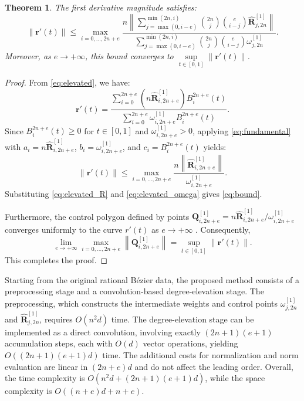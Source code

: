 \documentclass[preprint,12pt]{elsarticle}
\newcommand{\norm}[1]{\left\lVert #1 \right\rVert}
\newtheorem{Theorem}{Theorem}
\begin{document}
\begin{Theorem}\label{thm:bound}
The first derivative magnitude satisfies:
\begin{equation}\label{eq:bound}
\norm{\mathbf{r}'(t)} \leq \max_{i=0,\ldots,2n+e} \frac{n \norm{ \sum_{j=\max(0,i-e)}^{\min(2n,i)} \binom{2n}{j}\binom{e}{i-j} \widehat{\mathbf{R}}^{[1]}_{j,2n} }}{\sum_{j=\max(0,i-e)}^{\min(2n,i)} \binom{2n}{j}\binom{e}{i-j} \omega^{[1]}_{j,2n}}.
\end{equation}
Moreover, as $e \to +\infty$, this bound converges to $\sup\limits_{t \in [0,1]} \norm{\mathbf{r}'(t)}$.
\end{Theorem}

\begin{proof}
From \eqref{eq:elevated}, we have:
\[
\mathbf{r}'(t) = \frac{\sum_{i=0}^{2n+e} \left(n\widehat{\mathbf{R}}^{[1]}_{i,2n+e}\right) B^{2n+e}_i(t)}{\sum_{i=0}^{2n+e} \omega^{[1]}_{i,2n+e} B^{2n+e}_i(t)}.
\]
Since $B^{2n+e}_i(t) \geq 0$ for $t \in [0,1]$ and $\omega^{[1]}_{i,2n+e} > 0$, applying \eqref{eq:fundamental} with $a_i = n\widehat{\mathbf{R}}^{[1]}_{i,2n+e}$, $b_i = \omega^{[1]}_{i,2n+e}$, and $c_i = B^{2n+e}_i(t)$ yields:
\[
\norm{\mathbf{r}'(t)} \leq \max_{i=0,\ldots,2n+e} \frac{n\norm{\widehat{\mathbf{R}}^{[1]}_{i,2n+e}}}{\omega^{[1]}_{i,2n+e}}.
\]
Substituting \eqref{eq:elevated_R} and \eqref{eq:elevated_omega} gives \eqref{eq:bound}.

Furthermore, the control polygon defined by points $\mathbf{Q}^{[1]}_{i,2n+e} = n\widehat{\mathbf{R}}^{[1]}_{i,2n+e}/\omega^{[1]}_{i,2n+e}$ converges uniformly to the curve $r'(t)$ as $e \to +\infty$ \cite{Farin2002}. Consequently,
\[
\lim_{e \to +\infty} \max_{i=0,\ldots,2n+e} \norm{\mathbf{Q}^{[1]}_{i,2n+e}} = \sup_{t \in [0,1]} \norm{\mathbf{r}'(t)}.
\]
This completes the proof.
\end{proof}

Starting from the original rational Bézier data, the proposed method consists of a preprocessing stage
and a convolution-based degree-elevation stage.
The preprocessing, which constructs the intermediate weights and control points
$\omega^{[1]}_{j,2n}$ and $\widehat{\mathbf R}^{[1]}_{j,2n}$, requires $O(n^2 d)$ time.
The degree-elevation stage can be implemented as a direct convolution, involving exactly $(2n+1)(e+1)$
accumulation steps, each with $O(d)$ vector operations, yielding $O((2n+1)(e+1)d)$ time.
The additional costs for normalization and norm evaluation are linear in $(2n+e)d$ and do not affect
the leading order.
Overall, the time complexity is $O(n^2 d + (2n+1)(e+1)d)$, while the space complexity is
$O((n+e)d + n+e)$.
\end{document}
